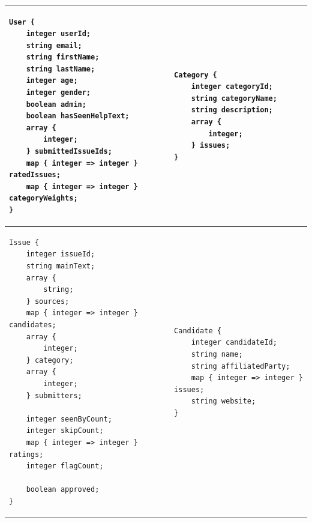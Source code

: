 \documentclass[11pt]{article}
\begin{document}
\begin{centering}
\begin{tabular}[t]{l|l}
    \begin{minipage}[t]{3.75in}
        \begin{verbatim}
User {
    integer userId;
    string email;
    string firstName;
    string lastName;
    integer age;
    integer gender;
    boolean admin;
    boolean hasSeenHelpText;
    array {
        integer;
    } submittedIssueIds;
    map { integer => integer } ratedIssues;
    map { integer => integer } categoryWeights;
}
        \end{verbatim}
    \end{minipage}
    &
    \begin{minipage}[t]{2.85in}
        \begin{verbatim}
Category {
    integer categoryId;
    string categoryName;
    string description;
    array {
        integer;
    } issues;
}
        \end{verbatim}
    \end{minipage}\\[10pt]
    \hline
    \begin{minipage}[t]{3.3in}
        \begin{verbatim}
Issue {
    integer issueId;
    string mainText;
    array {
        string;
    } sources;
    map { integer => integer } candidates;
    array {
        integer;
    } category;
    array {
        integer;
    } submitters;

    integer seenByCount;
    integer skipCount;
    map { integer => integer } ratings;
    integer flagCount;

    boolean approved;
}
        \end{verbatim}
    \end{minipage}
    &
    \begin{minipage}[t]{2.85in}
        \begin{verbatim}
Candidate {
    integer candidateId;
    string name;
    string affiliatedParty;
    map { integer => integer } issues;
    string website;
}
        \end{verbatim}
    \end{minipage}
\end{tabular}

\end{centering}
\end{document}
